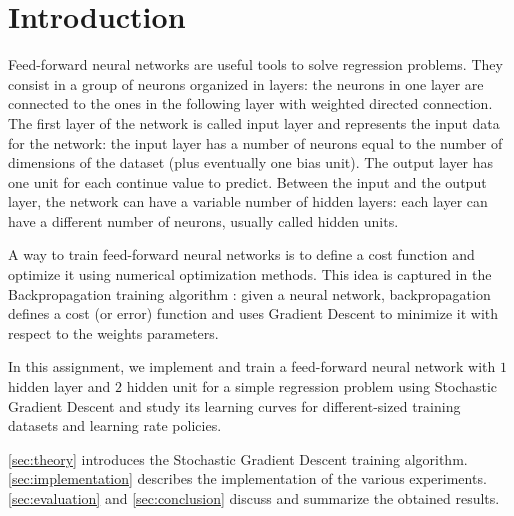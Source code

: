 \section{Introduction}
\label{sec:introduction}

Feed-forward neural networks are useful tools to solve regression problems.
They consist in a group of neurons organized in layers:
the neurons in one layer are connected to the ones in the following layer with weighted directed connection.
The first layer of the network is called input layer and represents the input data for the network:
the input layer has a number of neurons equal to the number of dimensions of the dataset (plus eventually one bias unit).
The output layer has one unit for each continue value to predict.
Between the input and the output layer, the network can have a variable number of hidden layers:
each layer can have a different number of neurons, usually called hidden units.

A way to train feed-forward neural networks is to define a cost function and optimize it using numerical optimization methods.
This idea is captured in the Backpropagation training algorithm \cite{chauvin1995backpropagation}:
given a neural network, backpropagation defines a cost (or error) function and uses Gradient Descent to minimize it with respect to the weights parameters.

In this assignment, we implement and train a feed-forward neural network with $1$ hidden layer and $2$ hidden unit for a simple regression problem using Stochastic Gradient Descent and study its learning curves for different-sized training datasets and learning rate policies.

\cref{sec:theory} introduces the Stochastic Gradient Descent training algorithm.
\cref{sec:implementation} describes the implementation of the various experiments.
\cref{sec:evaluation} and \cref{sec:conclusion} discuss and summarize the obtained results.
